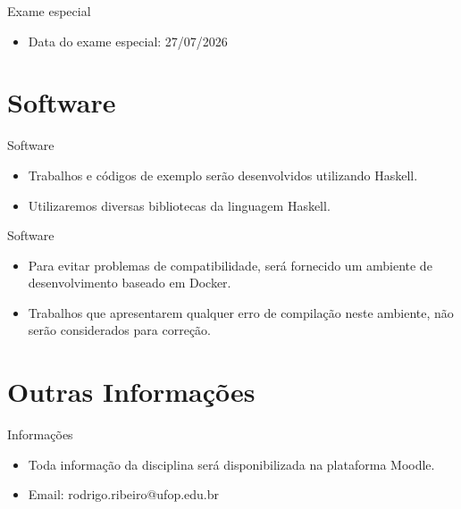 \begin{frame}{Exame especial}

    \begin{itemize}

        \item
        Data do exame especial: 27/07/2026
    \end{itemize}
\end{frame}


\section{Software}\label{software}

\begin{frame}{Software}

    \begin{itemize}
        \item
        Trabalhos e códigos de exemplo serão desenvolvidos utilizando Haskell.
        \item
        Utilizaremos diversas bibliotecas da linguagem Haskell.
    \end{itemize}
\end{frame}

\begin{frame}{Software}

    \begin{itemize}
        \item
        Para evitar problemas de compatibilidade, será fornecido um ambiente
        de desenvolvimento baseado em Docker.
        \item
        Trabalhos que apresentarem qualquer erro de compilação neste ambiente,
        não serão considerados para correção.
    \end{itemize}
\end{frame}


\section{Outras Informações}\label{outras-informauxe7uxf5es}

\begin{frame}{Informações}

    \begin{itemize}
        \item
        Toda informação da disciplina será disponibilizada na plataforma
        Moodle.
        \item
        Email: rodrigo.ribeiro@ufop.edu.br
    \end{itemize}
\end{frame}


